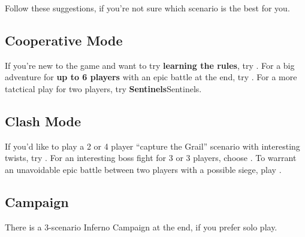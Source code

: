
\begin{multicols*}{2}

Follow these suggestions, if you're not sure which scenario is the best for you.

\subsection*{Cooperative Mode}

If you're new to the game and want to try \textbf{learning the rules}, try .
For a big adventure for \textbf{up to 6 players} with an epic battle at the end, try .
For a more tatctical play for two players, try \textbf{Sentinels}{Sentinels}.

\subsection*{Clash Mode}

If you'd like to play a 2 or 4 player ``capture the Grail'' scenario with interesting twists, try .
For an interesting boss fight for 3 or 3 players, choose .
To warrant an unavoidable epic battle between two players with a possible siege, play .

\subsection*{Campaign}

There is a 3-scenario Inferno  Campaign at the end, if you prefer solo play.

\end{multicols*}

